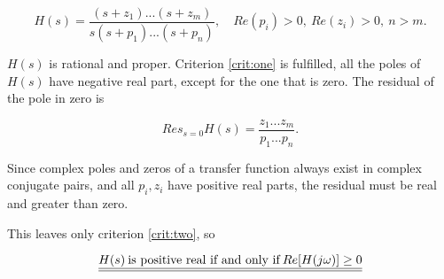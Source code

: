\documentclass{article}
\begin{document}
\begin{equation*}
    H(s) = \frac{(s + z_1)...(s+z_m)}{s(s + p_1)...(s+p_n)}, \quad Re(p_i) > 0, \: Re(z_i) > 0, \: n>m.
\end{equation*}

$H(s)$ is rational and proper. Criterion \ref{crit:one} is fulfilled, all the poles of $H(s)$ have negative real part, except for the one that is zero. 
The residual of the pole in zero is

\begin{equation*}
    Res_{s = 0} H(s) = \frac{z_1...z_m}{p_1...p_n}.
\end{equation*}

Since complex poles and zeros of a transfer function always exist in complex conjugate pairs, and all $p_i, z_i$ have positive real parts, the residual must be real and greater than zero. 

This leaves only criterion \ref{crit:two}, so

\begin{equation*}
    \underline{\underline{H(s) \: \textmd{is positive real if and only if}\: Re[H(j\omega)] \geq 0}}
\end{equation*}
\end{document}
